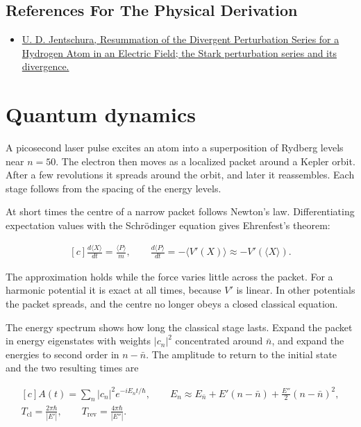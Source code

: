 \documentclass[11pt,oneside]{book}
\newenvironment{centeredalign}{\[\begin{gathered}[c]}{\end{gathered}\]}
\begin{document}
\subsection*{References For The Physical Derivation}
\begin{itemize}
\item \href{https://arxiv.org/abs/physics/0010038}{U. D. Jentschura, Resummation of the Divergent Perturbation Series for a Hydrogen Atom in an Electric Field; the Stark perturbation series and its divergence.}
\end{itemize}





\clearpage

\section{Quantum dynamics}

\label{topic:quantum-dynamics}

A picosecond laser pulse excites an atom into a superposition of Rydberg levels near \(n=50\). The electron then moves as a localized packet around a Kepler orbit. After a few revolutions it spreads around the orbit, and later it reassembles. Each stage follows from the spacing of the energy levels.

At short times the centre of a narrow packet follows Newton's law. Differentiating expectation values with the Schrödinger equation gives Ehrenfest's theorem:

\begin{centeredalign}
\frac{d\langle X\rangle}{dt}=\frac{\langle P\rangle}{m},\qquad
\frac{d\langle P\rangle}{dt}=-\langle V'(X)\rangle\approx-V'(\langle X\rangle).
\end{centeredalign}

The approximation holds while the force varies little across the packet. For a harmonic potential it is exact at all times, because \(V'\) is linear. In other potentials the packet spreads, and the centre no longer obeys a closed classical equation.

The energy spectrum shows how long the classical stage lasts. Expand the packet in energy eigenstates with weights \(|c_n|^2\) concentrated around \(\bar n\), and expand the energies to second order in \(n-\bar n\). The amplitude to return to the initial state and the two resulting times are

\begin{centeredalign}
A(t)=\sum_n|c_n|^2e^{-iE_nt/\hbar},\qquad
E_n\approx E_{\bar n}+E'(n-\bar n)+\frac{E''}{2}(n-\bar n)^2,\\
T_{\mathrm{cl}}=\frac{2\pi\hbar}{|E'|},\qquad T_{\mathrm{rev}}=\frac{4\pi\hbar}{|E''|}.
\end{centeredalign}
\end{document}
